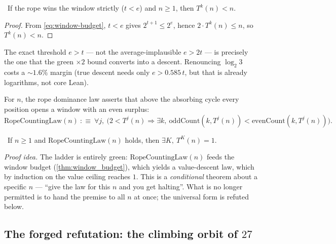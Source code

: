 \begin{theorem}\label{thm:window_descends}
\green{}\ If the rope wins the window strictly ($t<e$) and $n\ge 1$, then $T^{k}(n)<n$.
\end{theorem}

\begin{proof}
From \cref{eq:window-budget}, $t<e$ gives $2^{t+1}\le 2^{e}$, hence $2\cdot T^{k}(n)\le n$, so
$T^{k}(n)<n$.
\end{proof}

The exact threshold $e>t$ --- not the average-implausible $e>2t$ --- is precisely the one that the
green $\times 2$ bound converts into a descent. Renouncing $\log_2 3$ costs a $\sim 1.6\%$ margin
(true descent needs only $e>0.585\,t$, but that is already logarithms, not core Lean).

\begin{definition}\label{def:ropeCountingLaw}
For $n$, the rope dominance law asserts that above the absorbing cycle every position opens a window
with an even surplus:
\begin{equation}\label{eq:rope-law}
\mathrm{RopeCountingLaw}(n)\ :\equiv\ \forall j,\ \bigl(2<T^{j}(n)\Rightarrow \exists k,\ \mathrm{oddCount}(k,T^{j}(n))<\mathrm{evenCount}(k,T^{j}(n))\bigr).
\end{equation}
\end{definition}

\begin{theorem}\label{thm:reaches_one_of_countingLaw}
\green{}\ If $n\ge 1$ and $\mathrm{RopeCountingLaw}(n)$ holds, then $\exists K,\ T^{K}(n)=1$.
\end{theorem}

\emph{Proof idea.} The ladder is entirely green: $\mathrm{RopeCountingLaw}(n)$ feeds the window
budget (\cref{thm:window_budget}), which yields a value-descent law, which by induction on the value
ceiling reaches $1$. This is a \emph{conditional} theorem about a specific $n$ --- ``give the law for
this $n$ and you get halting''. What is no longer permitted is to hand the premise to all $n$ at
once; the universal form is refuted below.

\subsection{The forged refutation: the climbing orbit of $27$}

